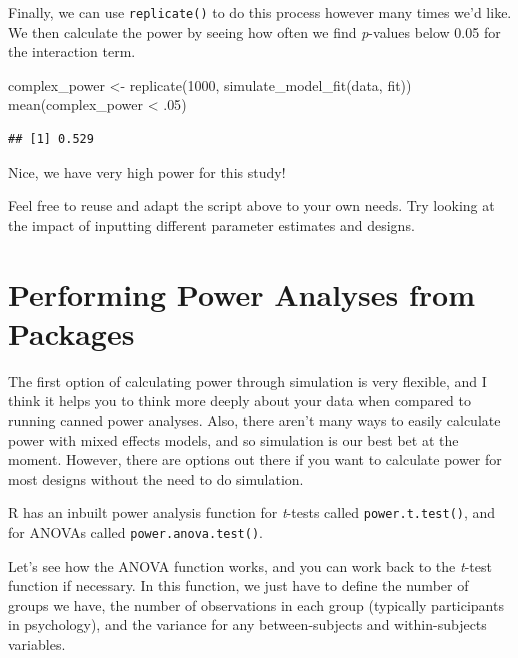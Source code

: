 \documentclass[
]{book}
\newenvironment{Shaded}{\begin{snugshade}}{\end{snugshade}}
\newcommand{\DecValTok}[1]{\textcolor[rgb]{0.00,0.00,0.81}{#1}}
\newcommand{\FunctionTok}[1]{\textcolor[rgb]{0.00,0.00,0.00}{#1}}
\newcommand{\NormalTok}[1]{#1}
\newcommand{\OtherTok}[1]{\textcolor[rgb]{0.56,0.35,0.01}{#1}}
\newcommand{\SpecialCharTok}[1]{\textcolor[rgb]{0.00,0.00,0.00}{#1}}
\begin{document}
Finally, we can use \texttt{replicate()} to do this process however many times we'd like. We then calculate the power by seeing how often we find \emph{p}-values below 0.05 for the interaction term.

\begin{Shaded}
\begin{Highlighting}[]
\NormalTok{complex\_power }\OtherTok{\textless{}{-}} \FunctionTok{replicate}\NormalTok{(}\DecValTok{1000}\NormalTok{, }\FunctionTok{simulate\_model\_fit}\NormalTok{(data, fit))}
\FunctionTok{mean}\NormalTok{(complex\_power }\SpecialCharTok{\textless{}}\NormalTok{ .}\DecValTok{05}\NormalTok{)}
\end{Highlighting}
\end{Shaded}

\begin{verbatim}
## [1] 0.529
\end{verbatim}

Nice, we have very high power for this study!

Feel free to reuse and adapt the script above to your own needs. Try looking at the impact of inputting different parameter estimates and designs.

\hypertarget{performing-power-analyses-from-packages}{%
\section{Performing Power Analyses from Packages}\label{performing-power-analyses-from-packages}}

The first option of calculating power through simulation is very flexible, and I think it helps you to think more deeply about your data when compared to running canned power analyses. Also, there aren't many ways to easily calculate power with mixed effects models, and so simulation is our best bet at the moment. However, there are options out there if you want to calculate power for most designs without the need to do simulation.

R has an inbuilt power analysis function for \emph{t}-tests called \texttt{power.t.test()}, and for ANOVAs called \texttt{power.anova.test()}.

Let's see how the ANOVA function works, and you can work back to the \emph{t}-test function if necessary. In this function, we just have to define the number of groups we have, the number of observations in each group (typically participants in psychology), and the variance for any between-subjects and within-subjects variables.
\end{document}
